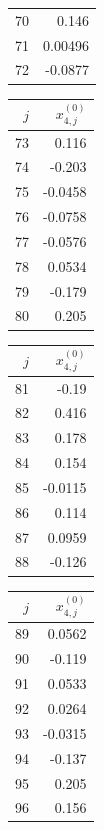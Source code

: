 {\begin{tabular}[t]{r|r}
70 & 0.146 \\
71 & 0.00496 \\
72 & -0.0877
\end{tabular}\kern4pt
\begin{tabular}[t]{r|r}
$j$ & $x^{(0)}_{4,j}$ \\\hline
73 & 0.116 \\
74 & -0.203 \\
75 & -0.0458 \\
76 & -0.0758 \\
77 & -0.0576 \\
78 & 0.0534 \\
79 & -0.179 \\
80 & 0.205
\end{tabular}\kern4pt
\begin{tabular}[t]{r|r}
$j$ & $x^{(0)}_{4,j}$ \\\hline
81 & -0.19 \\
82 & 0.416 \\
83 & 0.178 \\
84 & 0.154 \\
85 & -0.0115 \\
86 & 0.114 \\
87 & 0.0959 \\
88 & -0.126
\end{tabular}\kern4pt
\begin{tabular}[t]{r|r}
$j$ & $x^{(0)}_{4,j}$ \\\hline
89 & 0.0562 \\
90 & -0.119 \\
91 & 0.0533 \\
92 & 0.0264 \\
93 & -0.0315 \\
94 & -0.137 \\
95 & 0.205 \\
96 & 0.156
\end{tabular}}

